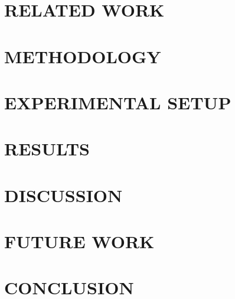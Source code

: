 \documentclass[12pt,a4paper]{report}
\begin{document}
\chapter{RELATED WORK}


\chapter{METHODOLOGY}


\chapter{EXPERIMENTAL SETUP}


\chapter{RESULTS}


\chapter{DISCUSSION}


\chapter{FUTURE WORK}


\chapter{CONCLUSION}


\clearpage

\nocite{*}
\renewcommand{\bibname}{REFERENCE}


\appendix


\end{document}
